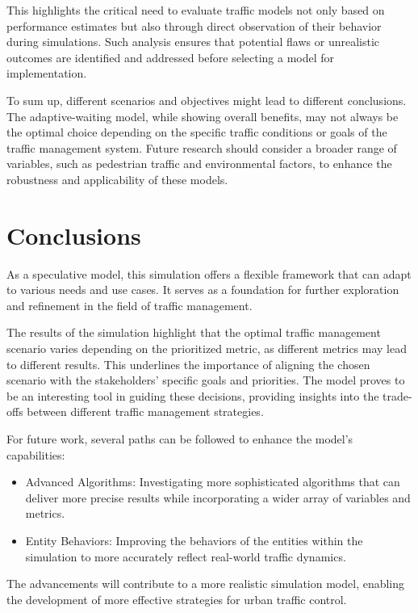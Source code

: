 \documentclass[sigconf]{acmart}
\begin{document}
This highlights the critical need to evaluate traffic models not only based on performance estimates but also through direct observation of their behavior during simulations. Such analysis ensures that potential flaws or unrealistic outcomes are identified and addressed before selecting a model for implementation.

To sum up,  different scenarios and objectives might lead to different conclusions. The adaptive-waiting model, while showing overall benefits, may not always be the optimal choice depending on the specific traffic conditions or goals of the traffic management system. Future research should consider a broader range of variables, such as pedestrian traffic and environmental factors, to enhance the robustness and applicability of these models.

\section{Conclusions}

As a speculative model, this simulation offers a flexible framework that can adapt to various needs and use cases. It serves as a foundation for further exploration and refinement in the field of traffic management.

The results of the simulation highlight that the optimal traffic management scenario varies depending on the prioritized metric, as different metrics may lead to different results. This underlines the importance of aligning the chosen scenario with the stakeholders’ specific goals and priorities. The model proves to be an interesting tool in guiding these decisions, providing insights into the trade-offs between different traffic management strategies.


For future work, several paths can be followed to enhance the model's capabilities:
\begin{itemize}
    \item Advanced Algorithms: Investigating more sophisticated algorithms that can deliver more precise results while incorporating a wider array of variables and metrics.
    \item Entity Behaviors: Improving the behaviors of the entities within the simulation to more accurately reflect real-world traffic dynamics.
\end{itemize}

The advancements will contribute to a more realistic simulation model, enabling the development of more effective strategies for urban traffic control.
\end{document}
